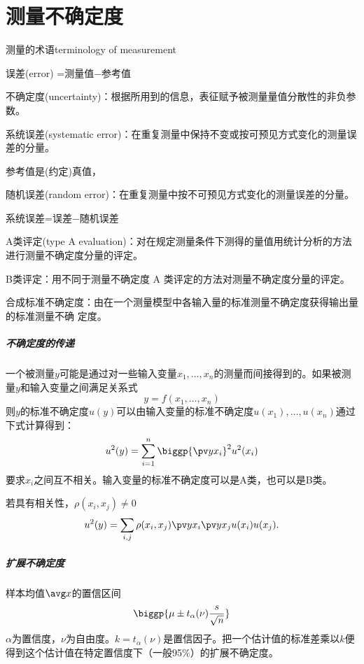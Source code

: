 \chapter{测量不确定度}
\begin{definition}{测量的术语}{terminology of measurement}
	\begin{compactitem}
		\item 误差(error) =测量值$-$参考值
		\item 不确定度(uncertainty)：根据所用到的信息，表征赋予被测量量值分散性的非负参数。
		\item 系统误差(systematic error)：在重复测量中保持不变或按可预见方式变化的测量误差的分量。
		
		参考值是(约定)真值，
		\item 随机误差(random error)：在重复测量中按不可预见方式变化的测量误差的分量。
		
		系统误差=误差$-$随机误差
		\item A类评定(type A evaluation)：对在规定测量条件下测得的量值用统计分析的方法进行测量不确定度分量的评定。
		\item B类评定：用不同于测量不确定度 A 类评定的方法对测量不确定度分量的评定。
		\item 合成标准不确定度：由在一个测量模型中各输入量的标准测量不确定度获得输出量的标准测量不确	定度。
	\end{compactitem}
\end{definition}
\paragraph{不确定度的传递}
一个被测量$ y $可能是通过对一些输入变量$x_1,\ldots,x_n$的测量而间接得到的。如果被测量$ y $和输入变量之间满足关系式
\[
	y=f(x_1,\ldots,x_n)
\]
则$ y $的标准不确定度$ u(y) $可以由输入变量的标准不确定度$u(x_1),\ldots,u(x_n)$通过下式计算得到：
\begin{equation}
	u^2(y)=\sum_{i=1}^n\biggp{\pv y{x_i}}^2u^2(x_i)
\end{equation}
要求$x_i$之间互不相关。输入变量的标准不确定度可以是A类，也可以是B类。

若具有相关性，$\rho(x_i,x_j)\neq 0$
\begin{equation}
	u^2(y)=\sum_{i,j}\rho(x_i,x_j)\pv y{x_i}\pv y{x_j}u(x_i)u(x_j).
\end{equation}
\paragraph{扩展不确定度}
样本均值$\avg x$的置信区间
\[
	\biggp{\mu\pm t_{\alpha}(\nu)\frac s{\sqrt n}}
\]
$\alpha$为置信度，$\nu$为自由度。$k=t_{\alpha}(\nu)$是置信因子。把一个估计值的标准差乘以$ k $便得到这个估计值在特定置信度下（一般95\%）的扩展不确定度。
